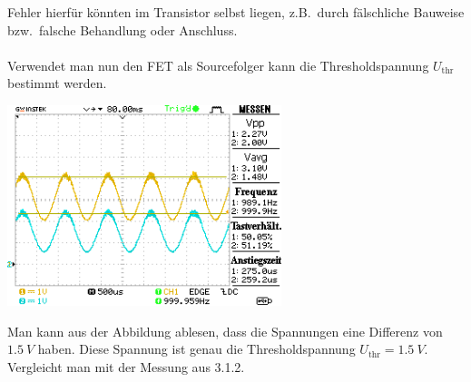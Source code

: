 \documentclass[10pt]{article}
\newenvironment{Figure}
  {\par\medskip\noindent\minipage{\linewidth}}
  {\endminipage\par\medskip}
\begin{document}
\begin{multicols}{2}
        Fehler hierfür könnten im Transistor selbst liegen, z.B.\ durch fälschliche Bauweise bzw.\ falsche Behandlung oder Anschluss.\\\\
        Verwendet man nun den FET als Sourcefolger kann die Thresholdspannung $U_{\text{thr}}$ bestimmt werden.
        \begin{Figure}
                \centering
                \includegraphics[width=0.6\textwidth]{data/DS0013.png}
        \end{Figure}
        Man kann aus der Abbildung ablesen, dass die Spannungen eine Differenz von $\SI{1.5}{V}$ haben.
        Diese Spannung ist genau die Thresholdspannung $U_{\text{thr}}=\SI{1.5}{V}$.
        Vergleicht man mit der Messung aus 3.1.2. 


\end{multicols}
\end{document}
